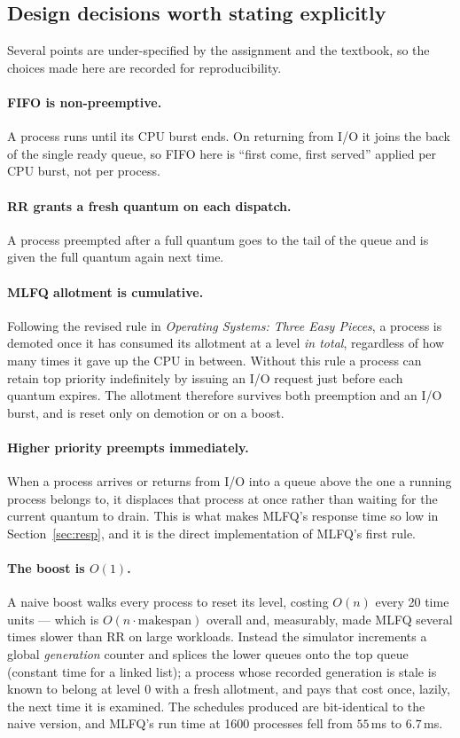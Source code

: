 \documentclass[11pt,a4paper]{article}
\begin{document}
\subsection{Design decisions worth stating explicitly}

Several points are under-specified by the assignment and the textbook, so the
choices made here are recorded for reproducibility.

\paragraph{FIFO is non-preemptive.} A process runs until its CPU burst ends. On
returning from I/O it joins the back of the single ready queue, so FIFO here is
``first come, first served'' applied per CPU burst, not per process.

\paragraph{RR grants a fresh quantum on each dispatch.} A process preempted
after a full quantum goes to the tail of the queue and is given the full
quantum again next time.

\paragraph{MLFQ allotment is cumulative.} Following the revised rule in
\emph{Operating Systems: Three Easy Pieces}, a process is demoted once it has
consumed its allotment at a level \emph{in total}, regardless of how many times
it gave up the CPU in between. Without this rule a process can retain top
priority indefinitely by issuing an I/O request just before each quantum
expires. The allotment therefore survives both preemption and an I/O burst, and
is reset only on demotion or on a boost.

\paragraph{Higher priority preempts immediately.} When a process arrives or
returns from I/O into a queue above the one a running process belongs to, it
displaces that process at once rather than waiting for the current quantum to
drain. This is what makes MLFQ's response time so low in
Section~\ref{sec:resp}, and it is the direct implementation of MLFQ's first
rule.

\paragraph{The boost is $O(1)$.} A naive boost walks every process to reset its
level, costing $O(n)$ every 20 time units --- which is $O(n \cdot
\text{makespan})$ overall and, measurably, made MLFQ several times slower than
RR on large workloads. Instead the simulator increments a global
\emph{generation} counter and splices the lower queues onto the top queue
(constant time for a linked list); a process whose recorded generation is stale
is known to belong at level 0 with a fresh allotment, and pays that cost once,
lazily, the next time it is examined. The schedules produced are bit-identical
to the naive version, and MLFQ's run time at 1600 processes fell from
$55$\,ms to $6.7$\,ms.
\end{document}

